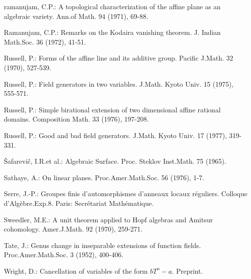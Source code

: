 \begin{thebibliography}{99}
 ramanujam, C.P.: A topological characterization of the affine
  plane as an algebraic variety. Ann.\@ of Math. 94 (1971), 69-88.

 Ramanujam, C.P.: Remarks on the Kodaira vanishing theorem. J.\@
  Indian Math.\@ Soc. 36 (1972), 41-51.

 Russell, P.: Forms of the affine line and its additive
  group. Pacific J.\@ Math. 32 (1970), 527-539.

 Russell, P.: Field generators in two variables. J.\@ Math. Kyoto
  Univ. 15 (1975), 555-571.

 Russell, P.: Simple birational extension of two dimensional
  affine rational domains. Composition Math. 33 (1976), 197-208.

 Russell, P.: Good and bad field generators. J.\@ Math. Kyoto
  Univ. 17 (1977), 319-331.

 \v{S}afarevi\v{c}, I.R.\@ et al.: Algebraic Surface. Proc.\@
  Steklov Inst.\@ Math. 75 (1965).

 Sathaye, A.: On linear planes. Proc.\@ Amer.\@ Math.\@ Soc. 56
  (1976), 1-7.

 Serre, J.-P.: Groupes finis d'automorphismes d'anneaux locaux
  r\'eguliers. Colloque d'Alg\`ebre.\@ Exp.\@ 8. Paris: Secr\'etariat
  Math\'ematique. 

 Sweedler, M.E.: A unit theorem applied to Hopf algebras and
  Amitsur cohomology. Amer.\@ J.\@ Math. 92 (1970), 259-271.

 Tate, J.: Genus change in inseparable extensions of function
  fields. Proc.\@ Amer.\@ Math.\@ Soc. 3 (1952), 400-406.

 Wright, D.: Cancellation of variables of the form
  $bT^{n}-a$. Preprint.
\end{thebibliography}

